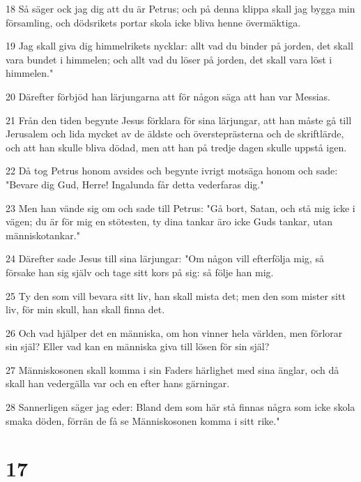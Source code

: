 \par 18 Så säger ock jag dig att du är Petrus; och på denna klippa skall jag bygga min församling, och dödsrikets portar skola icke bliva henne övermäktiga.
\par 19 Jag skall giva dig himmelrikets nycklar: allt vad du binder på jorden, det skall vara bundet i himmelen; och allt vad du löser på jorden, det skall vara löst i himmelen."
\par 20 Därefter förbjöd han lärjungarna att för någon säga att han var Messias.
\par 21 Från den tiden begynte Jesus förklara för sina lärjungar, att han måste gå till Jerusalem och lida mycket av de äldste och översteprästerna och de skriftlärde, och att han skulle bliva dödad, men att han på tredje dagen skulle uppstå igen.
\par 22 Då tog Petrus honom avsides och begynte ivrigt motsäga honom och sade: "Bevare dig Gud, Herre! Ingalunda får detta vederfaras dig."
\par 23 Men han vände sig om och sade till Petrus: "Gå bort, Satan, och stå mig icke i vägen; du är för mig en stötesten, ty dina tankar äro icke Guds tankar, utan människotankar."
\par 24 Därefter sade Jesus till sina lärjungar: "Om någon vill efterfölja mig, så försake han sig själv och tage sitt kors på sig: så följe han mig.
\par 25 Ty den som vill bevara sitt liv, han skall mista det; men den som mister sitt liv, för min skull, han skall finna det.
\par 26 Och vad hjälper det en människa, om hon vinner hela världen, men förlorar sin själ? Eller vad kan en människa giva till lösen för sin själ?
\par 27 Människosonen skall komma i sin Faders härlighet med sina änglar, och då skall han vedergälla var och en efter hans gärningar.
\par 28 Sannerligen säger jag eder: Bland dem som här stå finnas några som icke skola smaka döden, förrän de få se Människosonen komma i sitt rike."

\chapter{17}

